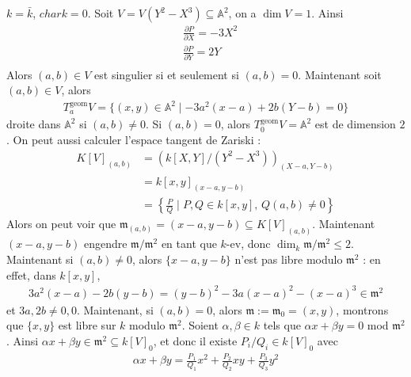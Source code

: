             \begin{expl}
                $k = \bar k$, $char k = 0$. Soit $V = V(Y^2 - X^3) \subseteq \mathbb{A}^2$, on a $\dim V = 1$. Ainsi
                \begin{align*}
                    &\frac{\partial P}{\partial X} = -3X^2 \\
                    &\frac{\partial P}{\partial Y} = 2Y \\
                \end{align*}
                Alors $(a,b) \in V$ est singulier si et seulement si $(a,b) = 0$. Maintenant soit $(a,b) \in V$, alors
                \begin{align*}
                    T_a^\mathrm{geom}V = \{(x,y) \in \mathbb{A}^2 \mid -3a^2(x-a) + 2b(Y - b) = 0\}
                \end{align*}
                droite dans $\mathbb{A}^2$ si $(a,b) \neq 0$. Si $(a,b) = 0$, alors $T_0^\mathrm{geom}V = \mathbb{A}^2$ est de dimension $2$. On peut aussi calculer l'espace tangent de Zariski :
                \begin{align*}
                    K[V]_{(a,b)} &= \left( k[X,Y]/(Y^2 - X^3) \right)_{(X-a, Y-b)} \\
                    &= k[x,y]_{(x-a, y-b)} \\ 
                    &= \left\{ \frac PQ \mid P,Q \in k[x,y],\, Q(a,b) \neq 0 \right\}
                \end{align*}
                Alors on peut voir que $\mathfrak{m}_{(a,b)} = (x-a,y-b) \subseteq K[V]_{(a,b)}$. Maintenant $(x-a, y-b)$ engendre $\mathfrak{m}/\mathfrak{m}^2$ en tant que $k$-ev, donc $\dim_k \mathfrak{m}/\mathfrak{m}^2 \leq 2$. Maintenant si $(a,b) \neq 0$, alors $\{x-a, y-b\}$ n'est pas libre modulo $\mathfrak{m}^2$ : en effet, dans $k[x,y]$,
                \begin{align*}
                    3a^2(x-a) - 2b(y-b) = (y - b)^2 - 3a(x - a)^2 - (x - a) ^3 \in \mathfrak{m}^2
                \end{align*}
                et $3a, 2b \neq 0,0$. Maintenant, si $(a,b) = 0$, alors $\mathfrak{m} := \mathfrak{m}_0 = (x,y)$, montrons que $\{x,y\}$ est libre sur $k$ modulo $\mathfrak{m}^2$. Soient $\alpha, \beta \in k$ tels que $\alpha x + \beta y = 0$ mod $\mathfrak{m}^2$. Ainsi $\alpha x + \beta y \in \mathfrak{m}^2 \subseteq k[V]_0$, et donc il existe $P_i/Q_i \in k[V]_0$ avec 
                \begin{align*}
                    \alpha x + \beta y = \frac{P_1}{Q_1}x^2 + \frac{P_2}{Q_2}xy + \frac{P_3}{Q_3}y^2

\end{align*}
\end{expl}
